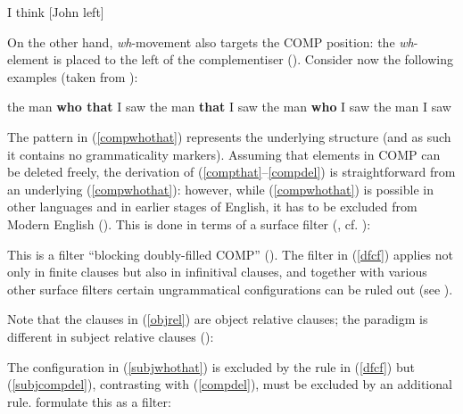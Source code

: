 \ea I think [John left]
\z

On the other hand, \textit{wh}-movement also targets the COMP position: the \textit{wh}-element is placed to the left of the complementiser (\citealt[434]{chomskylasnik1977}). Consider now the following examples (taken from \citealt[435, ex. 17]{chomskylasnik1977}):

\ea \label{objrel}
\ea the man \textbf{who that} I saw \label{compwhothat}
\ex the man \textbf{that} I saw \label{compthat}
\ex the man \textbf{who} I saw 
\ex the man I saw \label{compdel}
\z
\z

The pattern in (\ref{compwhothat}) represents the underlying structure (and as such it contains no grammaticality markers). Assuming that elements in COMP can be deleted freely, the derivation of (\ref{compthat}--\ref{compdel}) is straightforward from an underlying (\ref{compwhothat}): however, while (\ref{compwhothat}) is possible in other languages and in earlier stages of English, it has to be excluded from Modern English (\citealt[434--435, 446]{chomskylasnik1977}). This is done in terms of a surface filter (\citealt[435, ex. 18]{chomskylasnik1977}, cf. \citealt{keyser1975}):

\z

This is a filter ``blocking doubly-filled COMP'' (\citealt[461]{chomskylasnik1977}). The filter in (\ref{dfcf}) applies not only in finite clauses but also in infinitival clauses, and together with various other surface filters certain ungrammatical configurations can be ruled out (see \citealt[450--470]{chomskylasnik1977}).

Note that the clauses in (\ref{objrel}) are object relative clauses; the paradigm is different in subject relative clauses (\citealt[435, ex. 19]{chomskylasnik1977}):

\ea
{}
\z
\z

The configuration in (\ref{subjwhothat}) is excluded by the rule in (\ref{dfcf}) but (\ref{subjcompdel}), contrasting with (\ref{compdel}), must be excluded by an additional rule. \citet[435, ex. 20]{chomskylasnik1977} formulate this as a filter:

